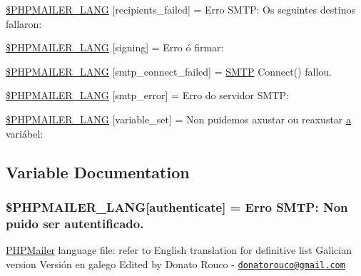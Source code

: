 \begin{DoxyCompactItemize}
\item 
\hyperlink{phpmailer_8lang-gl_8php_a7589d30bb9b368327c2df015f3e6bcba}{\$\+P\+H\+P\+M\+A\+I\+L\+E\+R\+\_\+\+L\+A\+NG} \mbox{[}\textquotesingle{}recipients\+\_\+failed\textquotesingle{}\mbox{]} = \textquotesingle{}Erro S\+M\+T\+P\+: Os seguintes destinos fallaron\+: \textquotesingle{}
\item 
\hyperlink{phpmailer_8lang-gl_8php_a68e437bdb9b968a5a67320f03d231565}{\$\+P\+H\+P\+M\+A\+I\+L\+E\+R\+\_\+\+L\+A\+NG} \mbox{[}\textquotesingle{}signing\textquotesingle{}\mbox{]} = \textquotesingle{}Erro ó firmar\+: \textquotesingle{}
\item 
\hyperlink{phpmailer_8lang-gl_8php_a7b321d4ca1e9df702403ed4c61aa0980}{\$\+P\+H\+P\+M\+A\+I\+L\+E\+R\+\_\+\+L\+A\+NG} \mbox{[}\textquotesingle{}smtp\+\_\+connect\+\_\+failed\textquotesingle{}\mbox{]} = \textquotesingle{}\hyperlink{class_s_m_t_p}{S\+M\+TP} Connect() fallou.\textquotesingle{}
\item 
\hyperlink{phpmailer_8lang-gl_8php_a7d9cffba1e669c845f8a4c891ee50064}{\$\+P\+H\+P\+M\+A\+I\+L\+E\+R\+\_\+\+L\+A\+NG} \mbox{[}\textquotesingle{}smtp\+\_\+error\textquotesingle{}\mbox{]} = \textquotesingle{}Erro do servidor S\+M\+T\+P\+: \textquotesingle{}
\item 
\hyperlink{phpmailer_8lang-gl_8php_af795debc7a739d038742691c358d9032}{\$\+P\+H\+P\+M\+A\+I\+L\+E\+R\+\_\+\+L\+A\+NG} \mbox{[}\textquotesingle{}variable\+\_\+set\textquotesingle{}\mbox{]} = \textquotesingle{}Non puidemos axustar ou reaxustar \hyperlink{_chart_8min_8js_aef3b685c08bc6c76c8e729bd0e93901d}{a} variábel\+: \textquotesingle{}
\end{DoxyCompactItemize}


\subsection{Variable Documentation}
\subsubsection[{\texorpdfstring{\$\+P\+H\+P\+M\+A\+I\+L\+E\+R\+\_\+\+L\+A\+NG}{$PHPMAILER_LANG}}]{\setlength{\rightskip}{0pt plus 5cm}\$P\+H\+P\+M\+A\+I\+L\+E\+R\+\_\+\+L\+A\+NG\mbox{[}\textquotesingle{}authenticate\textquotesingle{}\mbox{]} = \textquotesingle{}Erro S\+M\+T\+P\+: Non puido ser autentificado.\textquotesingle{}}\hypertarget{phpmailer_8lang-gl_8php_a2cb33073c989b85580748e331ed8b4aa}{}\label{phpmailer_8lang-gl_8php_a2cb33073c989b85580748e331ed8b4aa}
\hyperlink{class_p_h_p_mailer}{P\+H\+P\+Mailer} language file\+: refer to English translation for definitive list Galician version Versión en galego Edited by Donato Rouco -\/ \href{mailto:donatorouco@gmail.com}{\tt donatorouco@gmail.\+com} 

